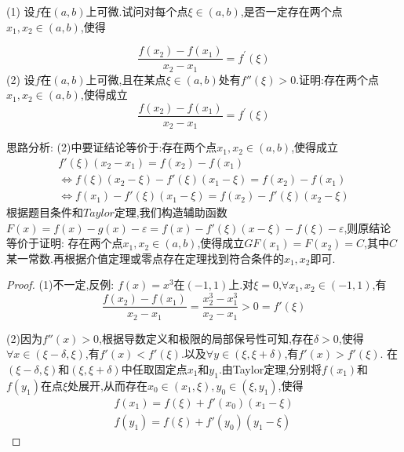 \documentclass[lang=cn,newtx,10pt,scheme=chinese]{../Template/elegantbook}
\begin{document}
\begin{exercise}
(1) 设\(f\)在\((a,b)\)上可微.试问对每个点\(\xi\in(a,b)\),是否一定存在两个点\(x_1,x_2\in(a,b)\),使得

\begin{equation}
\frac{f(x_2)-f(x_1)}{x_2 - x_1}=f^{\prime}(\xi)
\nonumber
\end{equation}
(2) 设\(f\)在\((a,b)\)上可微,且在某点\(\xi\in(a,b)\)处有\(f''(\xi)>0\).证明:存在两个点\(x_1,x_2\in(a,b)\),使得成立
\begin{equation}
    \frac{f(x_2)-f(x_1)}{x_2 - x_1}=f^{\prime}(\xi)
    \nonumber
\end{equation}
\begin{note}
    思路分析:
    (2)中要证结论等价于:存在两个点\(x_1,x_2\in(a,b)\),使得成立
    \begin{gather}
         f'(\xi)(x_2-x_1)=f(x_2)-f(x_1)\nonumber
         \\
         \Leftrightarrow f(\xi)(x_2-\xi)-f'(\xi)(x_1-\xi)=f(x_2)-f(x_1)
         \nonumber
         \\
         \Leftrightarrow f(x_1)-f'(\xi)(x_1-\xi)=f(x_2)-f'(\xi)(x_2-\xi)\nonumber
    \end{gather}
    根据题目条件和$Taylor$定理,我们构造辅助函数$F(x)=f(x)-g(x)-\varepsilon=f(x)-f'(\xi)(x-\xi)-f(\xi)-\varepsilon$,则原结论等价于证明:
    存在两个点\(x_1,x_2\in(a,b)\),使得成立$GF(x_1)=F(x_2)=C$,其中$C$某一常数.再根据介值定理或零点存在定理找到符合条件的$x_1,x_2$即可.
\end{note}
    \begin{proof}
        (1)不一定,反例:
        $f(x)=x^3$在$(-1,1)上$.对$\xi=0$,$\forall x_1,x_2\in(-1,1)$,有
        \begin{equation}
        \frac{f(x_2)-f(x_1)}{x_2-x_1}=\frac{x^3_2-x^3_1}{x_2-x_1}>0=f'(\xi)
            \nonumber
        \end{equation}
    
    (2)因为$f''(x)>0$,根据导数定义和极限的局部保号性可知,存在$\delta>0$,使得$\forall x\in(\xi-\delta,\xi)$,有$f'(x)<f'(\xi)$.以及$\forall y\in(\xi,\xi+\delta)$,有$f'(x)>f'(\xi)$.
    在$(\xi-\delta,\xi)$和$(\xi,\xi+\delta)$中任取固定点$x_1$和$y_1$.由Taylor定理,分别将$f(x_1)$和$f(y_1)$在点$\xi$处展开,从而存在$x_0\in(x_1,\xi), y_0\in(\xi,y_1)$,使得
    \begin{gather}
        f(x_1) = f(\xi) + f'(x_0)(x_1 - \xi) \nonumber\\
        f(y_1) = f(\xi) + f'(y_0)(y_1 - \xi) \nonumber
    \end{gather}
    

\end{proof}
\end{exercise}
\end{document}
